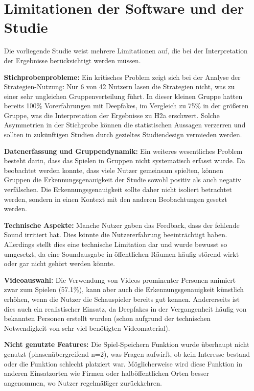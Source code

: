 \section{Limitationen der Software und der Studie}
Die vorliegende Studie weist mehrere Limitationen auf, die bei der Interpretation der Ergebnisse berücksichtigt werden müssen.

\textbf{Stichprobenprobleme:}
Ein kritisches Problem zeigt sich bei der Analyse der Strategien-Nutzung: 
Nur 6 von 42 Nutzern lasen die Strategien nicht, was zu einer sehr ungleichen Gruppenverteilung führt. 
In dieser kleinen Gruppe hatten bereits 100\% Vorerfahrungen mit Deepfakes, im Vergleich zu 75\% in der größeren Gruppe, 
was die Interpretation der Ergebnisse zu H2a erschwert. 
Solche Asymmetrien in der Stichprobe können die statistischen Aussagen verzerren und sollten in zukünftigen Studien durch gezieltes Studiendesign vermieden werden.

\textbf{Datenerfassung und Gruppendynamik:}
Ein weiteres wesentliches Problem besteht darin, dass das Spielen in Gruppen nicht systematisch erfasst wurde. 
Da beobachtet werden konnte, dass viele Nutzer gemeinsam spielten, 
können Gruppen die Erkennungsgenauigkeit der Studie sowohl positiv als auch negativ verfälschen. 
Die Erkennungsgenauigkeit sollte daher nicht isoliert betrachtet werden, sondern in einen Kontext mit den anderen Beobachtungen gesetzt werden. 

\textbf{Technische Aspekte:}
Manche Nutzer gaben das Feedback, dass der fehlende Sound irritiert hat. 
Dies könnte die Nutzererfahrung beeinträchtigt haben. 
Allerdings stellt dies eine technische Limitation dar und wurde bewusst so umgesetzt, 
da eine Soundausgabe in öffentlichen Räumen häufig störend wirkt oder gar nicht gehört werden könnte.

\textbf{Videoauswahl:}
Die Verwendung von Videos prominenter Personen animiert zwar zum Spielen (57.1\%), kann aber auch die Erkennungsgenauigkeit künstlich erhöhen, 
wenn die Nutzer die Schauspieler bereits gut kennen. 
Andererseits ist dies auch ein realistischer Einsatz, 
da Deepfakes in der Vergangenheit häufig von bekannten Personen erstellt wurden (schon aufgrund der technischen Notwendigkeit von sehr viel benötigten Videomaterial).

\textbf{Nicht genutzte Features:}
Die Spiel-Speichern Funktion wurde überhaupt nicht genutzt (phasenübergreifend n=2), was Fragen aufwirft, 
ob kein Interesse bestand oder die Funktion schlecht platziert war. 
Möglicherweise wird diese Funktion in anderen Einsatzorten wie Firmen oder halböffentlichen Orten besser angenommen, wo Nutzer regelmäßiger zurückkehren.


